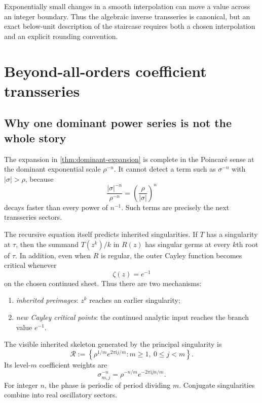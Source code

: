 \documentclass[11pt,oneside]{article}
\numberwithin{equation}{section}
\theoremstyle{plain}
\theoremstyle{definition}
\theoremstyle{remark}
\newcommand{\ii}{\mathrm i}
\begin{document}
\begin{warningbox}
Exponentially small changes in a smooth interpolation can move a value
across an integer boundary.  Thus the algebraic inverse transseries is
canonical, but an exact below-unit description of the staircase requires
both a chosen interpolation and an explicit rounding convention.
\end{warningbox}

\section{Beyond-all-orders coefficient transseries}\label{sec:global-transseries}

\subsection{Why one dominant power series is not the whole story}

The expansion in \cref{thm:dominant-expansion} is complete in the Poincar\'e
sense at the dominant exponential scale $\rho^{-n}$.  It cannot detect a
term such as $\sigma^{-n}$ with $|\sigma|>\rho$, because
\[
 \frac{|\sigma|^{-n}}{\rho^{-n}}=\left(\frac\rho{|\sigma|}\right)^n
\]
decays faster than every power of $n^{-1}$.  Such terms are precisely the
next transseries sectors.

The recursive equation itself predicts inherited singularities.  If $T$ has
a singularity at $\tau$, then the summand $T(z^k)/k$ in $R(z)$ has singular
germs at every $k$th root of $\tau$.  In addition, even when $R$ is regular,
the outer Cayley function becomes critical whenever
\begin{equation}\label{eq:continued-critical}
 \zeta(z)=e^{-1}
\end{equation}
on the chosen continued sheet.  Thus there are two mechanisms:
\begin{enumerate}
\item \emph{inherited preimages}: $z^k$ reaches an earlier singularity;
\item \emph{new Cayley critical points}: the continued analytic input reaches
      the branch value $e^{-1}$.
\end{enumerate}

The visible inherited skeleton generated by the principal singularity is
\begin{equation}\label{eq:root-skeleton}
 \mathscr R:=\left\{
 \rho^{1/m}e^{2\pi\ii j/m}:m\ge1,\ 0\le j<m
 \right\}.
\end{equation}
Its level-$m$ coefficient weights are
\begin{equation}\label{eq:root-sector-weight}
 \sigma_{m,j}^{-n}=\rho^{-n/m}e^{-2\pi\ii jn/m}.
\end{equation}
For integer $n$, the phase is periodic of period dividing $m$.  Conjugate
singularities combine into real oscillatory sectors.
\end{document}
